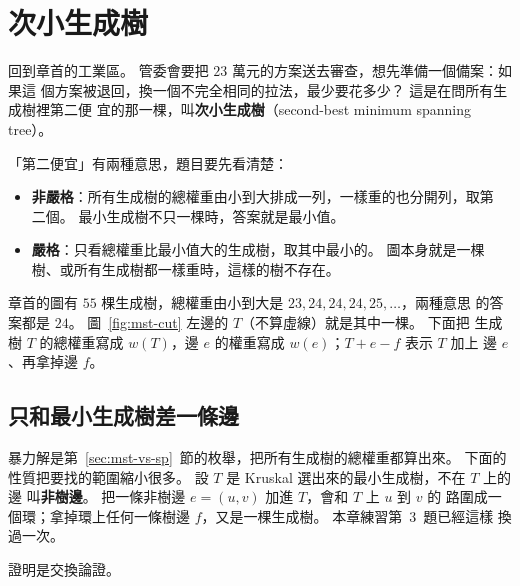 \section{次小生成樹}
\label{sec:second-mst}

回到章首的工業區。 管委會要把 $23$ 萬元的方案送去審查，想先準備一個備案：如果這
個方案被退回，換一個不完全相同的拉法，最少要花多少？ 這是在問所有生成樹裡第二便
宜的那一棵，叫\textbf{次小生成樹}（second-best minimum spanning tree）。

「第二便宜」有兩種意思，題目要先看清楚：

\begin{itemize}
\item \textbf{非嚴格}：所有生成樹的總權重由小到大排成一列，一樣重的也分開列，取第
二個。 最小生成樹不只一棵時，答案就是最小值。
\item \textbf{嚴格}：只看總權重比最小值大的生成樹，取其中最小的。 圖本身就是一棵
樹、或所有生成樹都一樣重時，這樣的樹不存在。
\end{itemize}

章首的圖有 $55$ 棵生成樹，總權重由小到大是 $23, 24, 24, 24, 25, \ldots$，兩種意思
的答案都是 $24$。 圖~\ref{fig:mst-cut} 左邊的 $T$（不算虛線）就是其中一棵。 下面把
生成樹 $T$ 的總權重寫成 $w(T)$，邊 $e$ 的權重寫成 $w(e)$；$T + e - f$ 表示 $T$ 加上
邊 $e$、再拿掉邊 $f$。

\subsection{只和最小生成樹差一條邊}

暴力解是第~\ref{sec:mst-vs-sp}~節的枚舉，把所有生成樹的總權重都算出來。 下面的
性質把要找的範圍縮小很多。 設 $T$ 是 Kruskal 選出來的最小生成樹，不在 $T$ 上的邊
叫\textbf{非樹邊}。 把一條非樹邊 $e = (u, v)$ 加進 $T$，會和 $T$ 上 $u$ 到 $v$ 的
路圍成一個環；拿掉環上任何一條樹邊 $f$，又是一棵生成樹。 本章練習第~3~題已經這樣
換過一次。

\begin{center}
\end{center}

證明是交換論證。

